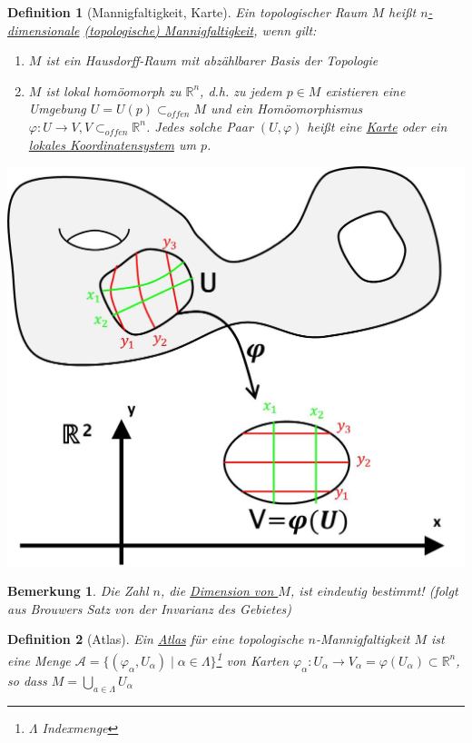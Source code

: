 \documentclass[a4paper,11pt,notitlepage]{report}
\newtheorem{definition}{Definition}[chapter]
\newtheorem{remark}{Bemerkung}[chapter]
\newcommand{\R}{{\ensuremath{\mathbb{R}}}}
\begin{document}
\begin{definition}[Mannigfaltigkeit, Karte]
	Ein topologischer Raum $M$ heißt \underline{$n$-dimensionale} \underline{(topologische) Mannigfaltigkeit}, wenn gilt:
	\begin{enumerate}
		\item $M$ ist ein Hausdorff-Raum mit abzählbarer Basis der Topologie
		\item $M$ ist lokal homöomorph zu $\R^n$, d.h. zu jedem $p \in M$ existieren eine Umgebung $U=U(p) \subset_{offen} M$ und ein Homöomorphismus $\varphi \colon U \rightarrow V, V \subset_{offen} \R^n$.
			\newline
			Jedes solche Paar $(U,\varphi)$ heißt eine \underline{Karte} oder ein \underline{lokales Koordinatensystem} um $p$.
	\end{enumerate}
\end{definition}
\begin{center}
	\includegraphics[scale=0.4]{images/Karte.jpg} 
\end{center} 
 
\begin{remark}
	Die Zahl $n$, die \underline{Dimension von $M$}, ist eindeutig bestimmt!
	(folgt aus Brouwers Satz von der Invarianz des Gebietes) 
\end{remark}

\begin{definition}[Atlas]
	Ein \underline{Atlas} für eine topologische $n$-Mannigfaltigkeit $M$ ist eine Menge $\mathcal{A} = \{(\varphi_\alpha, U_\alpha) \mid \alpha \in \Lambda\}$\footnote{$\Lambda$ Indexmenge}
	von Karten $\varphi_\alpha \colon U_\alpha \rightarrow V_\alpha = \varphi(U_\alpha) \subset \R^n$, so dass $M = \bigcup\limits_{a \in \Lambda}{U_\alpha}$
\end{definition}
\end{document}
